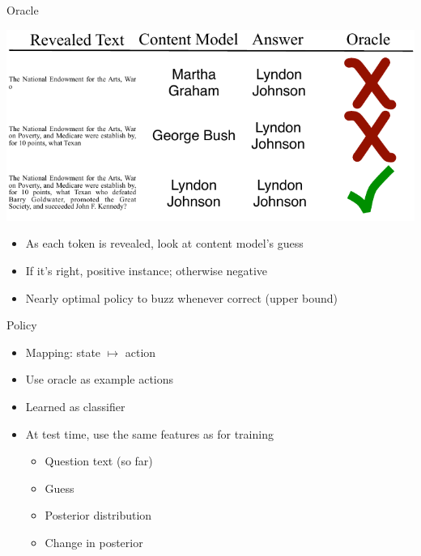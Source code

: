 \documentclass[compress]{beamer}
\begin{document}
\begin{frame}{Oracle}

\begin{center}
  \includegraphics[width=0.8\linewidth]{qb/oracle}
\end{center}

\begin{itemize}
  \item As each token is revealed, look at content model's guess
    \item If it's right, positive instance; otherwise negative
      \item Nearly optimal policy to buzz whenever correct (upper bound)
\end{itemize}

\end{frame}

\begin{frame}{Policy}


 \begin{itemize}
    \item Mapping: state $\mapsto$ action
    \item Use oracle as example actions
    \item Learned as classifier \cite{langford-05}
    \item At test time, use the same features as for training
      \begin{itemize}
        \item Question text (so far)
        \item Guess
        \item Posterior distribution
        \item Change in posterior
      \end{itemize}
\end{itemize}

\end{frame}
\end{document}
